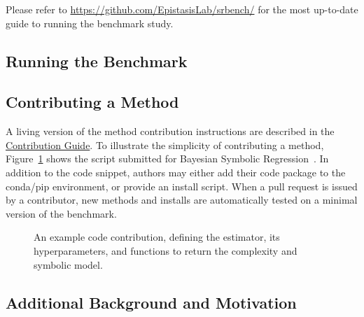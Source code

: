 Please refer to \url{https://github.com/EpistasisLab/srbench/} for the most up-to-date guide to running the benchmark study. 

\subsection{Running the Benchmark}

\subsection{Contributing a Method}
A living version of the method contribution instructions are described in the \href{https://github.com/EpistasisLab/srbench/blob/master/CONTRIBUTING.md}{Contribution Guide}.
To illustrate the simplicity of contributing a method, Figure~\ref{fig:ex_code} shows the script submitted for Bayesian Symbolic Regression~\cite{jinBayesianSymbolicRegression2020}. 
In addition to the code snippet, authors may either add their code package to the conda/pip environment, or provide an install script.
When a pull request is issued by a contributor, new methods and installs are automatically tested on a minimal version of the benchmark.  

\begin{figure}
	
    \caption{
        An example code contribution, defining the estimator, its hyperparameters, and functions to return the complexity and symbolic model.
    }\label{fig:ex_code} 
\end{figure}

\subsection{Additional Background and Motivation}

